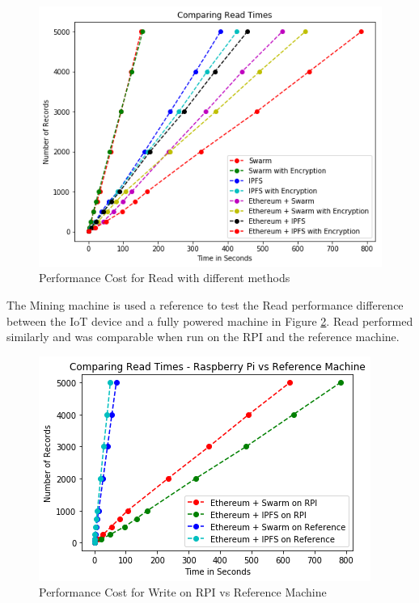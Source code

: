 \documentclass[11pt,openright]{report}
\begin{document}
\begin{figure}
    \centering
    \includegraphics[scale=0.8]{results/graphs/ReadComp.png}
    \caption{Performance Cost for Read with different methods}
    \label{fig:graph_perf_cost_read}
\end{figure}

The Mining machine is used a reference to test the Read performance difference between the IoT device and a fully powered machine in Figure \ref{fig:graph_perf_cost_read_pi_ref}. Read performed similarly and was comparable when run on the RPI and the reference machine.

\begin{figure}
    \centering
    \includegraphics[scale=1]{results/graphs/ReadComp_Pi_v_Ref.png}
    \caption{Performance Cost for Write on RPI vs Reference Machine}
    \label{fig:graph_perf_cost_read_pi_ref}
\end{figure}
\end{document}
